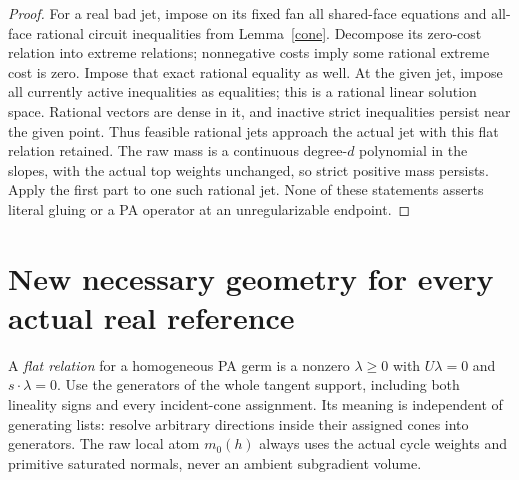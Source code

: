 \documentclass[11pt]{article}
\begin{document}
\begin{proof}
For a real bad jet, impose on its fixed fan all shared-face
equations and all-face rational circuit inequalities from
Lemma~\ref{cone}. Decompose its zero-cost relation into extreme
relations; nonnegative costs imply some rational extreme cost
is zero. Impose that exact rational equality as well. At the
given jet, impose all currently active inequalities as equalities;
this is a rational linear solution space. Rational vectors are
dense in it, and inactive strict inequalities persist near the
given point. Thus feasible rational jets approach the actual
jet with this flat relation retained. The raw mass is a continuous
degree-$d$ polynomial in the slopes, with the actual top weights
unchanged, so strict positive mass persists. Apply the first
part to one such rational jet. None of these statements asserts
literal gluing or a PA operator at an unregularizable endpoint.
\end{proof}

\section{New necessary geometry for every actual real reference}
A \emph{flat relation} for a homogeneous PA germ is a nonzero
$\lambda\geq0$ with $U\lambda=0$ and $s\cdot\lambda=0$.
Use the generators of the whole tangent support, including both
lineality signs and every incident-cone assignment. Its meaning is
independent of generating lists: resolve arbitrary directions
inside their assigned cones into generators. The raw local atom
$m_0(h)$ always uses the actual cycle weights and primitive saturated
normals, never an ambient subgradient volume.
\end{document}
